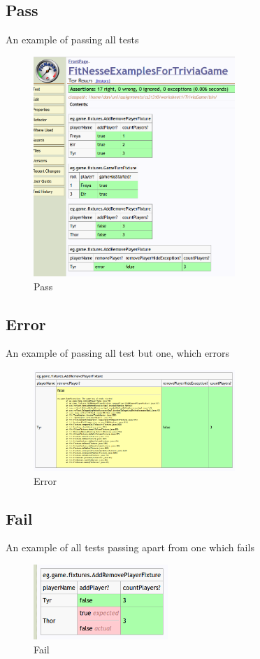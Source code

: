 \documentclass{article}
\begin{document}
\subsection{Pass}
An example of passing all tests
\begin{figure}[h]
\centering
        \includegraphics[width=3.0in] {figures/Screenshot2.png}
        \caption{Pass}
        \label{Pass}
\end{figure}

\subsection{Error}
An example of passing all test but one, which errors
\begin{figure}[h]
\centering
        \includegraphics[width=3.0in] {figures/Screenshot3.png}
        \caption{Error}
        \label{Error}
\end{figure}

\subsection{Fail}
An example of all tests passing apart from one which fails
\begin{figure}[h]
\centering
        \includegraphics[width=2.0in] {figures/Screenshot4.png}
        \caption{Fail}
        \label{Fail}
\end{figure}
\end{document}
